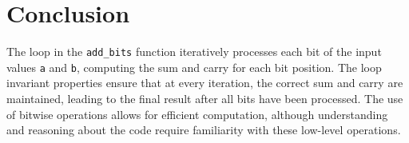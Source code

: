 \documentclass{article}
\begin{document}
\section*{Conclusion}

The loop in the \texttt{add\_bits} function iteratively processes each bit of the input values \texttt{a} and \texttt{b}, computing the sum and carry for each bit position. The loop invariant properties ensure that at every iteration, the correct sum and carry are maintained, leading to the final result after all bits have been processed. The use of bitwise operations allows for efficient computation, although understanding and reasoning about the code require familiarity with these low-level operations.
\end{document}
